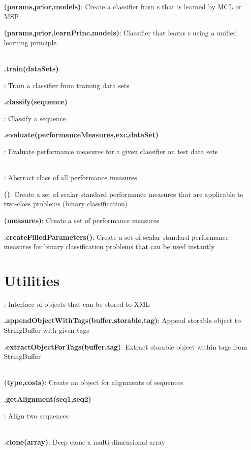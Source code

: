 \documentclass[10pt]{scrartcl}
\newcommand{\entry}[3]{{\item[]\bfseries #1#2}: #3}
\newcommand{\entrys}[3]{\item[\emph{static}] {\bfseries {#1#2}}: #3}
\newcommand{\entryn}[3]{\item[new] {\bfseries {#1#2}}: #3}
\newcommand{\sep}{\\~\vspace{-0.1cm}}
\begin{document}
\begin{flushleft}
\begin{itemize*}
\entryn{\MSPClassifier}{(params,prior,models)}{Create a classifier from \DiffSM s that is learned by MCL or MSP}

\entryn{\GenDisMixClassifier}{(params,prior,learnPrinc,models)}{Classifier that learns \DiffSM s using a unified learning principle}\sep

\entry{\AbstractClassifier}{.train(dataSets)}{Train a classifier from training data sets}

\entry{\AbstractClassifier}{.classify(sequence)}{Classify a sequence}

\entry{\AbstractClassifier}{.evaluate(performanceMeasures,exc,dataSet)}{Evaluate performance measures for a given classifier on test data sets}\sep

\entry{\AbstractPerformanceMeasure}{}{Abstract class of all performance measures}

\entryn{\NumericalPerformanceMeasureParameterSet}{()}{Create a set of scalar standard performance measures that are applicable to two-class problems (binary classification)}

\entryn{\PerformanceMeasureParameterSet}{(measures)}{Create a set of performance measures}

\entrys{\PerformanceMeasureParameterSet}{.createFilledParameters()}{Create a set of scalar standard performance measures for binary classification problems that can be used instantly}

\end{itemize*}

\section{Utilities}

\begin{itemize*}

\entry{\Storable}{}{Interface of objects that can be stored to XML}

\entrys{\XMLParser}{.appendObjectWithTags(buffer,storable,tag)}{Append storable object to StringBuffer with given tags}

\entrys{\XMLParser}{.extractObjectForTags(buffer,tag)}{Extract storable object within tags from StringBuffer}\sep

\entryn{\Alignment}{(type,costs)}{Create an object for alignments of sequences}

\entry{\Alignment}{.getAlignment(seq1,seq2)}{Align two sequences}\sep

\entrys{\ArrayHandler}{.clone(array)}{Deep clone a multi-dimensional array}


\end{itemize*}
\end{flushleft}
\end{document}
